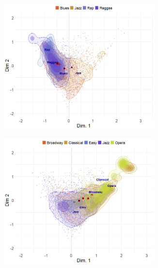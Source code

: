 \documentclass[12pt]{article}
\begin{document}
\begin{figure}[t]
\begin{subfigure}[b]{0.49\textwidth}
        \includegraphics[trim={0cm 0cm 0cm 0cm},clip, width=0.9\textwidth]{Plots/genre-proto-ex4.png}
            \caption{}
            \label{fig:}
    \end{subfigure}
     \begin{subfigure}[b]{0.49\textwidth}
        \includegraphics[trim={0cm 0cm 0cm 0cm},clip, width=0.9\textwidth]{Plots/genre-proto-ex7.png}
            \caption{}
            \label{fig:}
    \end{subfigure}
     \begin{subfigure}[b]{0.49\textwidth}

\end{subfigure}
\end{figure}
\end{document}
